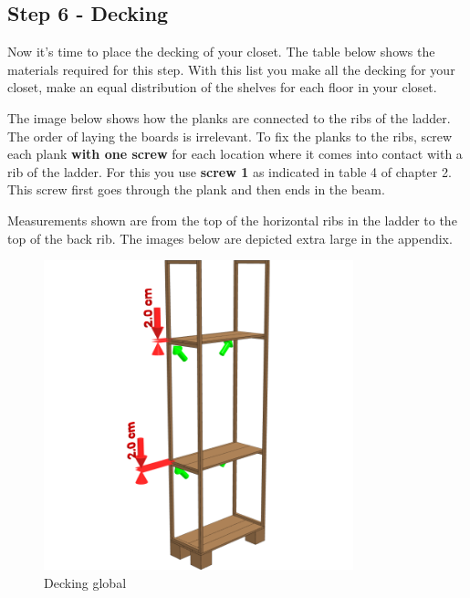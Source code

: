 \documentclass{article}
\begin{document}
\subsection{Step 6 - Decking}

Now it's time to place the decking of your closet. The table below shows the materials required for this step. With this list you make all the decking for your closet, make an equal distribution of the shelves for each floor in your closet.



The image below shows how the planks are connected to the ribs of the ladder. The order of laying the boards is irrelevant. To fix the planks to the ribs, screw each plank \textbf{with one screw} for each location where it comes into contact with a rib of the ladder. For this you use \textbf{screw 1} as indicated in table 4 of chapter 2. This screw first goes through the plank and then ends in the beam.

Measurements shown are from the top of the horizontal ribs in the ladder to the top of the back rib. The images below are depicted extra large in the appendix.

\begin{figure}[h!]
    \centering
    \includegraphics[width=0.8\textwidth]{scene 6 - vlonders a.png}
    \caption{Decking global}
    \label{fig:stap 6a}
\end{figure}
\end{document}
